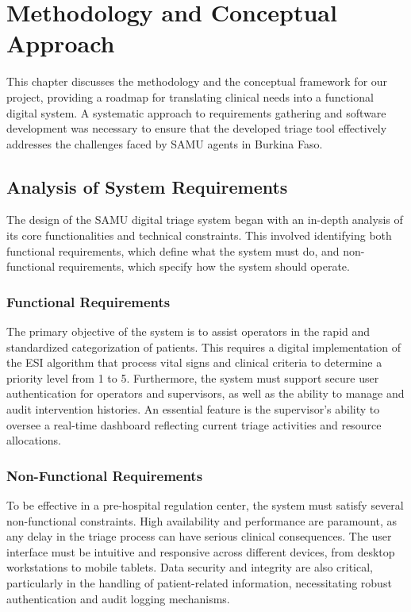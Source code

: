 \chapter{Methodology and Conceptual Approach}
\thispagestyle{fancy}
\justifying

This chapter discusses the methodology and the conceptual framework for our project, providing a roadmap for translating clinical needs into a functional digital system. A systematic approach to requirements gathering and software development was necessary to ensure that the developed triage tool effectively addresses the challenges faced by SAMU agents in Burkina Faso.

\section{Analysis of System Requirements}
The design of the SAMU digital triage system began with an in-depth analysis of its core functionalities and technical constraints. This involved identifying both functional requirements, which define what the system must do, and non-functional requirements, which specify how the system should operate.

\subsection{Functional Requirements}
The primary objective of the system is to assist operators in the rapid and standardized categorization of patients. This requires a digital implementation of the ESI algorithm that process vital signs and clinical criteria to determine a priority level from 1 to 5. Furthermore, the system must support secure user authentication for operators and supervisors, as well as the ability to manage and audit intervention histories. An essential feature is the supervisor's ability to oversee a real-time dashboard reflecting current triage activities and resource allocations.

\subsection{Non-Functional Requirements}
To be effective in a pre-hospital regulation center, the system must satisfy several non-functional constraints. High availability and performance are paramount, as any delay in the triage process can have serious clinical consequences. The user interface must be intuitive and responsive across different devices, from desktop workstations to mobile tablets. Data security and integrity are also critical, particularly in the handling of patient-related information, necessitating robust authentication and audit logging mechanisms.


